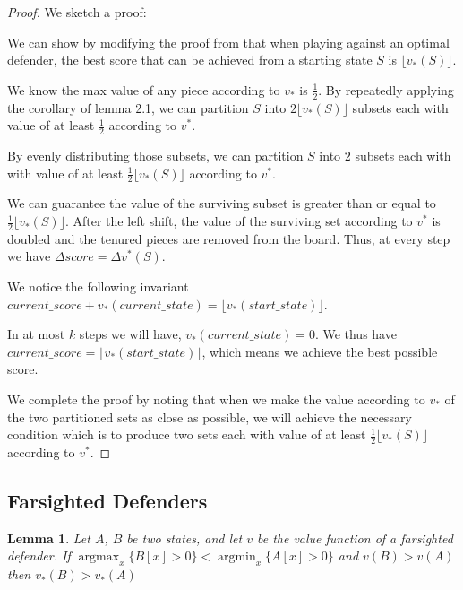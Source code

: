\documentclass{article}
\newcommand{\floor}[1]{\lfloor #1 \rfloor}
\theoremstyle{plain}
\newtheorem{lem}[thm]{Lemma}
\theoremstyle{definition}
\theoremstyle{remark}
\DeclareMathOperator*{\argmax}{argmax}
\DeclareMathOperator*{\argmin}{argmin}
\begin{document}
\begin{proof}
	We sketch a proof:
	
	We can show by modifying the proof from \cite{original} that when playing against an optimal defender, the best score that can be achieved from a starting state $S$ is $\floor{v_{*}(S)}$.
	
	We know the max value of any piece according to $v_*$ is $\frac{1}{2}$. By repeatedly applying the corollary of lemma 2.1, we can partition $S$ into $2 \floor{v_{*}(S)}$ subsets each with value of at least $\frac{1}{2}$ according to $v^*$. 
	
	By evenly distributing those subsets, we can partition $S$ into $2$ subsets each with with value of at least $\frac{1}{2}\floor{v_{*}(S)}$ according to $v^*$.
	
	We can guarantee the value of the surviving subset is greater than or equal to $\frac{1}{2}\floor{v_{*}(S)}$. After the left shift, the value of the surviving set according to $v^*$ is doubled and the tenured pieces are removed from the board. Thus, at every step we have $\Delta score = \Delta v^*(S)$.
	
	We notice the following invariant $current\_score + v_{*}(current\_state) = \floor{v_{*}(start\_state)}$.
	
	In at most $k$ steps we will have, $v_{*}(current\_state) = 0$. We thus have $current\_score = \floor{v_{*}(start\_state)}$, which means we achieve the best possible score.
	
	We complete the proof by noting that when we make the value according to $v_{*}$ of the two partitioned sets as close as possible, we will achieve the necessary condition which is to produce two sets each with value of at least $\frac{1}{2}\floor{v_{*}(S)}$ according to $v^*$.
\end{proof}

\subsection{Farsighted Defenders}

\begin{lem}
	Let $A$, $B$ be two states, and let $v$ be the value function of a farsighted defender. If $\argmax_x \{B[x] > 0\} < \argmin_x \{A[x] > 0\}$ and $v(B) > v(A)$ then $v_*(B) > v_*(A)$
\end{lem}
\end{document}
